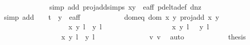 \begin{isabellebody}
\ \ \ \ \ \ \ \ \ \ \ \ \isamarkupfalse%
{\isacharparenleft}simp\ add{\isacharcolon}\ proj{\isacharunderscore}add{\isachardot}simps\ {\isacartoucheopen}{\isacharparenleft}x{\isacharcomma}y{\isacharparenright}\ {\isasymin}\ e{\isacharunderscore}aff{\isacartoucheclose}\ p{\isacharunderscore}delta{\isacharunderscore}def\ d{\isacharunderscore}{}{\isacharunderscore}nz{\isacharparenright}\isanewline
\ \ \ \ \ \ \ \ \ \ \ \ \isamarkupfalse%
{\isacharparenleft}simp\ add{\isacharcolon}\ {\isacartoucheopen}{\isacharparenleft}{}{\isacharcomma}\ {}\ {\isacharslash}\ {\isacharparenleft}t\ {\isacharasterisk}\ y{\isacharprime}{\isacharparenright}{\isacharparenright}\ {\isasymnotin}\ e{\isacharunderscore}aff{\isacartoucheclose}{\isacharparenright}\isanewline
\ \ \ \ \ \ \ \ \ \ \isamarkupfalse%
\ dom{\isacharunderscore}eq{\isacharcolon}\ {\isachardoublequoteopen}{\isacharparenleft}dom\ {\isacharparenleft}{\isasymlambda}{\isacharparenleft}x{\isacharcomma}\ y{\isacharparenright}{\isachardot}\ proj{\isacharunderscore}add\ x\ y{\isacharparenright}\ {\isasyminter}\isanewline
\ \ \ \ \ \ \ \ \ \ \ \ \ \ \ \ \ \ {\isacharbraceleft}{\isacharparenleft}{\isacharparenleft}{\isacharparenleft}x{\isacharcomma}\ y{\isacharparenright}{\isacharcomma}\ l{\isacharparenright}{\isacharcomma}\ {\isacharparenleft}{}{\isacharcomma}\ y{\isacharprime}{\isacharparenright}{\isacharcomma}\ l{\isacharprime}{\isacharparenright}{\isacharcomma}\isanewline
\ \ \ \ \ \ \ \ \ \ \ \ \ \ \ \ \ \ \ {\isacharparenleft}{\isacharparenleft}{\isacharparenleft}x{\isacharcomma}\ y{\isacharparenright}{\isacharcomma}\ l{\isacharparenright}{\isacharcomma}\ {\isasymtau}\ {\isacharparenleft}{}{\isacharcomma}\ y{\isacharprime}{\isacharparenright}{\isacharcomma}\ l{\isacharprime}\ {\isacharplus}\ {}{\isacharparenright}{\isacharbraceright}{\isacharparenright}\ {\isacharequal}\ \isanewline
\ \ \ \ \ \ \ \ \ \ \ \ \ \ \ \ {\isacharbraceleft}{\isacharparenleft}{\isacharparenleft}{\isacharparenleft}x{\isacharcomma}\ y{\isacharparenright}{\isacharcomma}\ l{\isacharparenright}{\isacharcomma}\ {\isacharparenleft}{}{\isacharcomma}\ y{\isacharprime}{\isacharparenright}{\isacharcomma}\ l{\isacharprime}{\isacharparenright}{\isacharbraceright}{\isachardoublequoteclose}\ \isanewline
\ \ \ \ \ \ \ \ \ \ \ \ \isamarkupfalse%
\ v{}\ v{}\ \isamarkupfalse%
\ auto\isanewline
\ \ \ \ \ \ \ \ \ \ \isamarkupfalse%
\ {\isacharquery}thesis\ \isanewline

\end{isabellebody}
